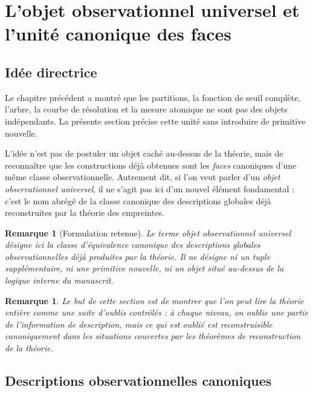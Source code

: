 \documentclass[11pt,a4paper,openany]{book}
\newtheorem{remark}[definition]{Remarque}
\begin{document}
\section{L'objet observationnel universel et l'unité canonique des faces}

\subsection{Idée directrice}

Le chapitre précédent a montré que les partitions, la fonction de seuil complète, l'arbre, la courbe de résolution et la mesure atomique ne sont pas des objets indépendants.  
La présente section précise cette unité sans introduire de primitive nouvelle.

L'idée n'est pas de postuler un objet caché au-dessus de la théorie, mais de reconnaître que les constructions déjà obtenues sont les \emph{faces} canoniques d'une même classe observationnelle.  
Autrement dit, si l'on veut parler d'un \emph{objet observationnel universel}, il ne s'agit pas ici d'un nouvel élément fondamental : c'est le nom abrégé de la classe canonique des descriptions globales déjà reconstruites par la théorie des empreintes.

\begin{remark}[Formulation retenue]
Le terme \emph{objet observationnel universel} désigne ici la classe d'équivalence canonique des descriptions globales observationnelles déjà produites par la théorie. Il ne désigne ni un tuple supplémentaire, ni une primitive nouvelle, ni un objet situé au-dessus de la logique interne du manuscrit.
\end{remark}

\begin{remark}
Le but de cette section est de montrer que l'on peut lire la théorie entière comme une suite d'oublis contrôlés : à chaque niveau, on oublie une partie de l'information de description, mais ce qui est oublié est reconstruisible canoniquement dans les situations couvertes par les théorèmes de reconstruction de la théorie.
\end{remark}

\subsection{Descriptions observationnelles canoniques}
\end{document}
